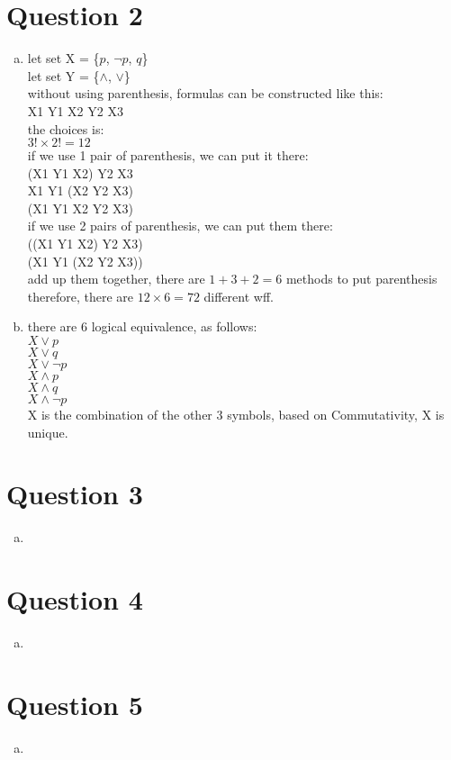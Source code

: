 \documentclass[11pt, a4paper]{article}
\begin{document}
\section*{Question 2}
\begin{enumerate}[(a)]
    \item    
        let set X = \{$p$, $\neg p$, $q$\}\\
        let set Y = \{$\land$, $\lor$\}\\
        without using parenthesis, formulas can be constructed like this:\\
        X1 Y1 X2 Y2 X3\\
        the choices is:\\
        $3! \times 2! = 12$\\
        if we use 1 pair of parenthesis, we can put it there:\\
        (X1 Y1 X2) Y2 X3\\
        X1 Y1 (X2 Y2 X3)\\
        (X1 Y1 X2 Y2 X3)\\
        if we use 2 pairs of parenthesis, we can put them there:\\
        ((X1 Y1 X2) Y2 X3)\\
        (X1 Y1 (X2 Y2 X3))\\
        add up them together, there are $1+3+2=6$ methods to put parenthesis\\
        therefore, there are $12 \times 6 = 72$ different wff.
    \item
        there are 6 logical equivalence, as follows:\\
        $X \lor p$\\
        $X \lor q$\\
        $X \lor \neg p$\\
        $X \land p$\\
        $X \land q$\\
        $X \land \neg p$\\
        X is the combination of the other 3 symbols, based on Commutativity, X is unique.

    \end{enumerate}

\section*{Question 3}
\begin{enumerate}[(a)]
    \item 
\end{enumerate}

\section*{Question 4}
\begin{enumerate}[(a)]
    \item 
\end{enumerate}

\section*{Question 5}
\begin{enumerate}[(a)]
    \item 
\end{enumerate}
\end{document}
